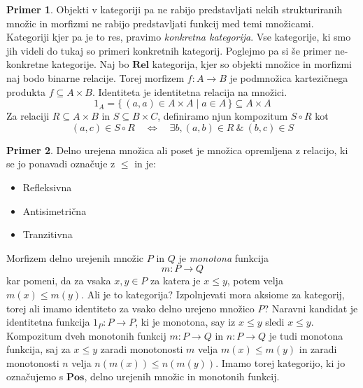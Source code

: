 \documentclass[12pt,a4paper]{book}
\theoremstyle{definition}
\theoremstyle{plain}
\theoremstyle{definition}
\newtheorem{primer}{Primer}[section]
\theoremstyle{remark}
\newcommand{\cat}[1]{\textbf{#1}}
\renewcommand{\set}[1]{\{\,#1\,\}}
\begin{document}
\begin{primer}
Objekti v kategoriji pa ne rabijo predstavljati nekih strukturiranih množic in morfizmi ne rabijo predstavljati funkcij med temi množicami. Kategoriji kjer pa je to res, pravimo \emph{konkretna kategorija}. Vse kategorije, ki smo jih videli do tukaj so primeri konkretnih kategorij. 
Poglejmo pa si še primer ne-konkretne kategorije. Naj bo $\cat{Rel}$ kategorija, kjer so objekti množice in morfizmi naj bodo binarne relacije. Torej morfizem $f : A \to B$ je podmnožica kartezičnega produkta $f \subseteq A \times B$. Identiteta je identitetna relacija na množici.
$$ 1_A = \set{(a,a) \in A \times A \mid a \in A} \subseteq A \times A$$
Za relaciji $R \subseteq A \times B$ in $S \subseteq B \times C$, definiramo njun kompozitum $S \circ R$ kot
$$(a,c) \in S \circ R \quad \Leftrightarrow \quad \exists b, (a,b) \in R \ \& \ (b,c) \in S$$

\end{primer}

\begin{primer}
Delno urejena množica ali poset je množica opremljena z relacijo, ki se jo ponavadi označuje z $\leq$ in je:
\begin{itemize}
\item Refleksivna
\item Antisimetrična
\item Tranzitivna
\end{itemize}
Morfizem delno urejenih množic $P$ in $Q$ je \emph{monotona} funkcija
$$m : P \to Q$$
kar pomeni, da za vsaka $x,y \in P$ za katera je $x \leq y$, potem velja $m(x) \leq m(y)$. Ali je to kategorija? Izpolnjevati mora aksiome za kategorij, torej ali imamo identiteto za vsako delno urejeno množico $P$? Naravni kandidat je identitetna funkcija $1_P : P \to P$, ki je monotona, say iz $x \leq y$ sledi $x \leq y$.
Kompozitum dveh monotonih funkcij $m : P \to Q$ in $n : P \to Q$ je tudi monotona funkcija, saj za $x \leq y$ zaradi monotonosti $m$ velja $m(x) \leq m(y)$ in zaradi monotonosti $n$ velja $n(m(x)) \leq n(m(y))$. Imamo torej kategorijo, ki jo označujemo s $\cat{Pos}$, delno urejenih množic in monotonih funkcij.
\end{primer}
\end{document}
